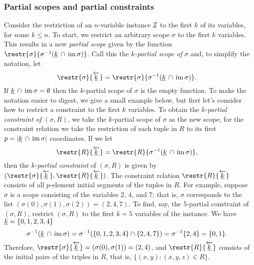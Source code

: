 \subsubsection{Partial scopes and partial constraints}
Consider the restriction of an
$n$-variable \csp instance $\mathcal{I}$ to the first $k$ of its variables, for some
$k\leq n$.
To start, we restrict an arbitrary scope $\sigma$ to the first $k$
variables. This results in a new \emph{partial scope} given by the function
\newcommand\kcapsigma{\ensuremath{\kk \, \cap\, \im \sigma}}
$\restr{\sigma}{\sigma^{-1}(\kcapsigma)}$.
Call this the \emph{$k$-partial scope of} $\sigma$ and, 
to simplify the notation, let
\[
\restr{\sigma}{\overleftarrow{\kk}}=\restr{\sigma}{\sigma^{-1}(\kcapsigma)}.
\]
If $\kcapsigma = \emptyset$ then the $k$-partial scope of $\sigma$
is the empty function.
To make the notation easier to digest, we give a small example below, but first
let's consider how to restrict a constraint to the first $k$ variables.
To obtain the \emph{$k$-partial constraint of} $(\sigma, R)$, we take the $k$-partial
scope of $\sigma$ as the new scope; for the constraint relation we take the
restriction of each tuple in $R$ to its first $p = |\kcapsigma|$ coordinates.  If we let
\[\restr{R}{\overleftarrow{\kk}}=\restr{R}{\sigma^{-1}(\kcapsigma)},\]
then the \emph{$k$-partial constraint} of $(\sigma, R)$ is given by
$(\restr{\sigma}{\overleftarrow{\kk}},
\restr{R}{\overleftarrow{\kk}})$.
The constraint relation $\restr{R}{\overleftarrow{\kk}}$
consists of all $p$-element initial segments of the tuples in $R$.
For example, suppose $\sigma$ is a scope consisting of the variables $2$, $4$, and $7$; that is,
$\sigma$ corresponds to the list $(\sigma(0), \sigma(1),\sigma(2)) = (2,4,7)$.
To find, say, the 5-partial constraint of $(\sigma, R)$, restrict $(\sigma, R)$
to the first $k= 5$ variables of the instance.
We have $\underline{k} = \{0,1,2,3,4\}$ 
\[
\sigma^{-1}(\kcapsigma) = \sigma^{-1}(\{0,1,2,3,4\} \cap \{2,4,7\})
= \sigma^{-1}\{2,4\} = \{0,1\}.
\]
Therefore,
$\restr{\sigma}{\overleftarrow{\kk}} = (\sigma(0), \sigma(1)) = (2,4)$,
and
$\restr{R}{\overleftarrow{\kk}}$
consists of the initial pairs of the triples in $R$, that is,
$\{(x,y) : (x,y,z) \in R\}$.

